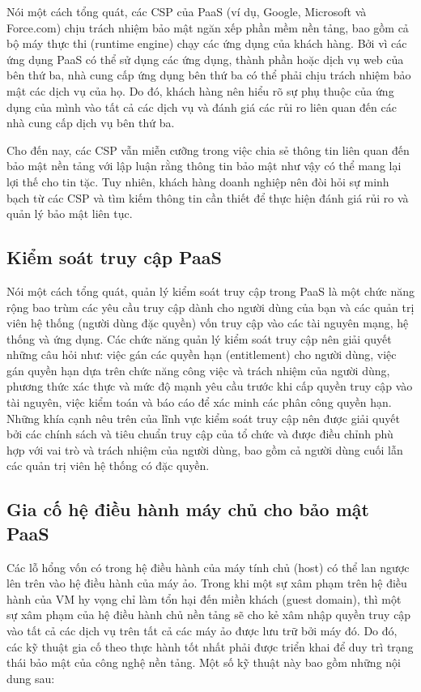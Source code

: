 Nói một cách tổng quát, các CSP của PaaS (ví dụ, Google, Microsoft và Force.com) chịu trách nhiệm bảo mật ngăn xếp phần mềm nền tảng, bao gồm cả bộ máy thực thi (runtime engine) chạy các ứng dụng của khách hàng. Bởi vì các ứng dụng PaaS có thể sử dụng các ứng dụng, thành phần hoặc dịch vụ web của bên thứ ba, nhà cung cấp ứng dụng bên thứ ba có thể phải chịu trách nhiệm bảo mật các dịch vụ của họ. Do đó, khách hàng nên hiểu rõ sự phụ thuộc của ứng dụng của mình vào tất cả các dịch vụ và đánh giá các rủi ro liên quan đến các nhà cung cấp dịch vụ bên thứ ba.

Cho đến nay, các CSP vẫn miễn cưỡng trong việc chia sẻ thông tin liên quan đến bảo mật nền tảng với lập luận rằng thông tin bảo mật như vậy có thể mang lại lợi thế cho tin tặc. Tuy nhiên, khách hàng doanh nghiệp nên đòi hỏi sự minh bạch từ các CSP và tìm kiếm thông tin cần thiết để thực hiện đánh giá rủi ro và quản lý bảo mật liên tục.

\subsection*{Kiểm soát truy cập PaaS}

Nói một cách tổng quát, quản lý kiểm soát truy cập trong PaaS là một chức năng rộng bao trùm các yêu cầu truy cập dành cho người dùng của bạn và các quản trị viên hệ thống (người dùng đặc quyền) vốn truy cập vào các tài nguyên mạng, hệ thống và ứng dụng. Các chức năng quản lý kiểm soát truy cập nên giải quyết những câu hỏi như: việc gán các quyền hạn (entitlement) cho người dùng, việc gán quyền hạn dựa trên chức năng công việc và trách nhiệm của người dùng, phương thức xác thực và mức độ mạnh yêu cầu trước khi cấp quyền truy cập vào tài nguyên, việc kiểm toán và báo cáo để xác minh các phân công quyền hạn. Những khía cạnh nêu trên của lĩnh vực kiểm soát truy cập nên được giải quyết bởi các chính sách và tiêu chuẩn truy cập của tổ chức và được điều chỉnh phù hợp với vai trò và trách nhiệm của người dùng, bao gồm cả người dùng cuối lẫn các quản trị viên hệ thống có đặc quyền.

\subsection*{Gia cố hệ điều hành máy chủ cho bảo mật PaaS}

Các lỗ hổng vốn có trong hệ điều hành của máy tính chủ (host) có thể lan ngược lên trên vào hệ điều hành của máy ảo. Trong khi một sự xâm phạm trên hệ điều hành của VM hy vọng chỉ làm tổn hại đến miền khách (guest domain), thì một sự xâm phạm của hệ điều hành chủ nền tảng sẽ cho kẻ xâm nhập quyền truy cập vào tất cả các dịch vụ trên tất cả các máy ảo được lưu trữ bởi máy đó. Do đó, các kỹ thuật gia cố theo thực hành tốt nhất phải được triển khai để duy trì trạng thái bảo mật của công nghệ nền tảng. Một số kỹ thuật này bao gồm những nội dung sau:

